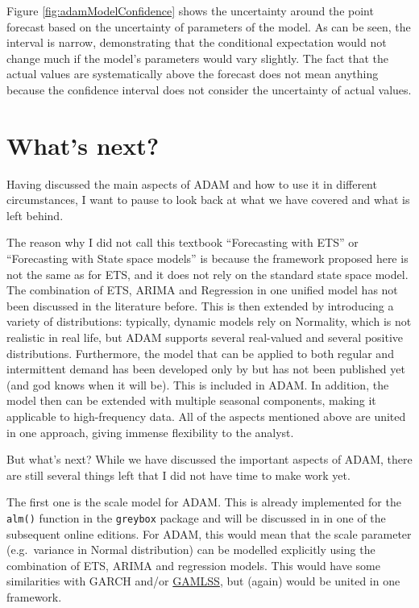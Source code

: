 \documentclass[
]{book}
\theoremstyle{definition}
\theoremstyle{definition}
\theoremstyle{definition}
\theoremstyle{definition}
\theoremstyle{remark}
\begin{document}
Figure \ref{fig:adamModelConfidence} shows the uncertainty around the point forecast based on the uncertainty of parameters of the model. As can be seen, the interval is narrow, demonstrating that the conditional expectation would not change much if the model's parameters would vary slightly. The fact that the actual values are systematically above the forecast does not mean anything because the confidence interval does not consider the uncertainty of actual values.

\hypertarget{conclusions}{%
\chapter{What's next?}\label{conclusions}}

Having discussed the main aspects of ADAM and how to use it in different circumstances, I want to pause to look back at what we have covered and what is left behind.

The reason why I did not call this textbook ``Forecasting with ETS'' or ``Forecasting with State space models'' is because the framework proposed here is not the same as for ETS, and it does not rely on the standard state space model. The combination of ETS, ARIMA and Regression in one unified model has not been discussed in the literature before. This is then extended by introducing a variety of distributions: typically, dynamic models rely on Normality, which is not realistic in real life, but ADAM supports several real-valued and several positive distributions. Furthermore, the model that can be applied to both regular and intermittent demand has been developed only by \citet{Svetunkov2019a} but has not been published yet (and god knows when it will be). This is included in ADAM. In addition, the model then can be extended with multiple seasonal components, making it applicable to high-frequency data. All of the aspects mentioned above are united in one approach, giving immense flexibility to the analyst.

But what's next? While we have discussed the important aspects of ADAM, there are still several things left that I did not have time to make work yet.

The first one is the scale model for ADAM. This is already implemented for the \texttt{alm()} function in the \texttt{greybox} package and will be discussed in \citet{SvetunkovSBA} in one of the subsequent online editions. For ADAM, this would mean that the scale parameter (e.g.~variance in Normal distribution) can be modelled explicitly using the combination of ETS, ARIMA and regression models. This would have some similarities with GARCH and/or \href{https://www.gamlss.com/}{GAMLSS}, but (again) would be united in one framework.
\end{document}
